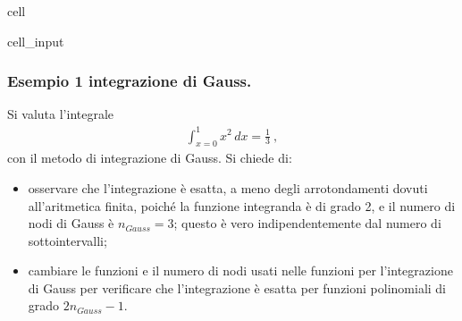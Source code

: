 \documentclass[letterpaper,10pt,english]{jupyterBook}
\begin{document}
\begin{sphinxuseclass}{cell}
\begin{sphinxVerbatimInput}
\begin{sphinxuseclass}{cell_input}
\begin{sphinxVerbatim}[commandchars=\\\{\}]
     \PYG{p}{[}   \PYG{p}{[}\PYG{p}{]} \PYG{p}{[}\PYG{p}{]}     \PYG{p}{]}
\end{sphinxVerbatim}

\end{sphinxuseclass}\end{sphinxVerbatimInput}

\end{sphinxuseclass}

\subsubsection{Esempio 1 \sphinxhyphen{} integrazione di Gauss.}
\label{\detokenize{ch/numerics/integrals:esempio-1-integrazione-di-gauss}}
\sphinxAtStartPar
Si valuta l’integrale
\begin{equation*}
\begin{split}\int_{x = 0}^{1} x^2 \, dx = \frac{1}{3} \ ,\end{split}
\end{equation*}
\sphinxAtStartPar
con il metodo di integrazione di Gauss.
Si chiede di:
\begin{itemize}
\item {} 
\sphinxAtStartPar
osservare che l’integrazione è esatta, a meno degli arrotondamenti dovuti all’aritmetica finita,
poiché la funzione integranda è di grado 2, e il numero di nodi di Gauss è \(n_{Gauss} = 3\); questo è vero indipendentemente dal numero di sotto\sphinxhyphen{}intervalli;

\item {} 
\sphinxAtStartPar
cambiare le funzioni e il numero di nodi usati nelle funzioni per l’integrazione di Gauss per verificare che l’integrazione è esatta per funzioni polinomiali di grado \(2 n_{Gauss} - 1\).

\end{itemize}
\end{document}
